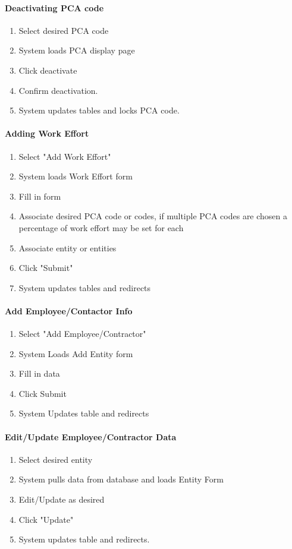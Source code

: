 \documentclass[letterpaper]{article}
\begin{document}
\paragraph{Deactivating PCA code}
\begin{enumerate}
\item Select desired PCA code
\item System loads PCA display page
\item Click deactivate
\item Confirm deactivation.
\item System updates tables and locks PCA code.
\end{enumerate}

\paragraph{Adding Work Effort}
\begin{enumerate}
\item Select "Add Work Effort"
\item System loads Work Effort form
\item Fill in form
\item Associate desired PCA code or codes, if multiple PCA codes are chosen a percentage of work effort may be set for each
\item Associate entity or entities
\item Click "Submit"
\item System updates tables and redirects
\end{enumerate}

\paragraph{Add Employee/Contactor Info}
\begin{enumerate}
\item Select "Add Employee/Contractor"
\item System Loads Add Entity form
\item Fill in data
\item Click Submit
\item System Updates table and redirects
\end{enumerate}

\paragraph{Edit/Update Employee/Contractor Data}
\begin{enumerate}
\item Select desired entity
\item System pulls data from database and loads Entity Form
\item Edit/Update as desired
\item Click "Update"
\item System updates table and redirects.
\end{enumerate}
\end{document}
